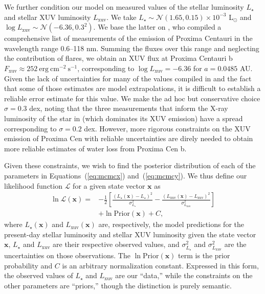 \documentclass[]{emulateapj}
\begin{document}
We further condition our model on measured values of the stellar luminosity $L_\star$ and 
stellar XUV luminosity $L_\mathrm{xuv}$. We take
$L_\star \sim \mathcal{N}(1.65, 0.15) \times 10^{-3}$ L$_\odot$ \citep{Demory09} and 
$\log L_\mathrm{xuv} \sim \mathcal{N}(-6.36, 0.3^2)$. We base the latter on \cite{Ribas16}, who compiled a comprehensive
list of measurements of the emission of Proxima Centauri in the wavelength range 0.6--118 nm. Summing the fluxes over
this range and neglecting the contribution of flares, we obtain an XUV flux at Proxima Centauri b 
$F_\mathrm{xuv} \approx 252\ \mathrm{erg\ cm^{-2}\ s^{-1}}$, corresponding to $\log L_\mathrm{xuv} = -6.36$ for $a = 0.0485$ AU. Given the
lack of uncertainties for many of the values compiled in \cite{Ribas16} and the fact that some of those estimates
are model extrapolations, it is difficult to establish a reliable error estimate for this value. We make the 
ad hoc but conservative choice $\sigma = 0.3$ dex, noting that the three measurements that inform the X-ray luminosity 
of the star in \cite{Ribas16} (which dominates its XUV emission) have a spread corresponding to $\sigma = 0.2$ dex. 
However, more rigorous constraints on the XUV emission of Proxima Cen with reliable uncertainties are direly needed
to obtain more reliable estimates of water loss from Proxima Cen b.

Given these constraints, we wish to find the posterior distribution of each of the parameters in Equations~(\ref{eq:mcmcx}) 
and~(\ref{eq:mcmcy}). We thus define our likelihood function $\mathcal{L}$ for a given state vector $\mathbf{x}$ as
%
\begin{align}
\ln \mathcal{L}(\mathbf{x}) = &- \frac{1}{2}\left[\frac{(L_\mathrm{\star}(\mathbf{x}) - L_\mathrm{\star})^2}{\sigma_{L_\star}^2}
                               - \frac{(L_\mathrm{xuv}(\mathbf{x}) - L_\mathrm{xuv})^2}{\sigma_{L_\mathrm{xuv}}^2}\right]
                                 \nonumber\\
                              &+ \ln \mathrm{Prior}(\mathbf{x}) + C,
\end{align}
%
where $L_\mathrm{\star}(\mathbf{x})$ and $L_\mathrm{xuv}(\mathbf{x})$ are, respectively, the model predictions for the present-day 
stellar luminosity and stellar XUV luminosity given the state vector $\mathbf{x}$, $L_\mathrm{\star}$ and $L_\mathrm{xuv}$ are
their respective observed values, and $\sigma_{L_\star}^2$ and $\sigma_{L_\mathrm{xuv}}^2$ are the uncertainties on those observations. The
$\ln \mathrm{Prior}(\mathbf{x})$ term is the prior probability and $C$ is an arbitrary normalization constant. Expressed in this form,
the observed values of $L_\mathrm{\star}$ and $L_\mathrm{xuv}$ are our ``data,'' while the constraints on the other parameters
are ``priors,'' though the distinction is purely semantic.
\end{document}
